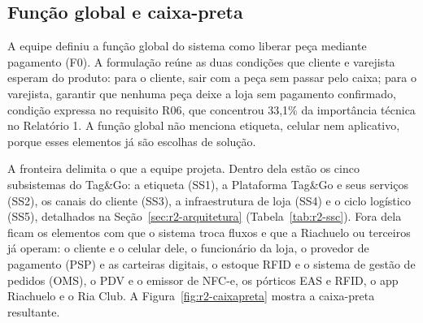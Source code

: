 \subsection{Função global e caixa-preta}
\label{sub:r2-caixapreta}

A equipe definiu a função global do sistema como liberar peça mediante pagamento (F0). A formulação reúne as duas condições que cliente e varejista esperam do produto: para o cliente, sair com a peça sem passar pelo caixa; para o varejista, garantir que nenhuma peça deixe a loja sem pagamento confirmado, condição expressa no requisito R06, que concentrou 33,1\% da importância técnica no Relatório 1. A função global não menciona etiqueta, celular nem aplicativo, porque esses elementos já são escolhas de solução.

A fronteira delimita o que a equipe projeta. Dentro dela estão os cinco subsistemas do Tag\&Go: a etiqueta (SS1), a Plataforma Tag\&Go e seus serviços (SS2), os canais do cliente (SS3), a infraestrutura de loja (SS4) e o ciclo logístico (SS5), detalhados na Seção~\ref{sec:r2-arquitetura} (Tabela~\ref{tab:r2-ssc}). Fora dela ficam os elementos com que o sistema troca fluxos e que a Riachuelo ou terceiros já operam: o cliente e o celular dele, o funcionário da loja, o provedor de pagamento (PSP) e as carteiras digitais, o estoque RFID e o sistema de gestão de pedidos (OMS), o PDV e o emissor de NFC-e, os pórticos EAS e RFID, o app Riachuelo e o Ria Club. A Figura~\ref{fig:r2-caixapreta} mostra a caixa-preta resultante.

